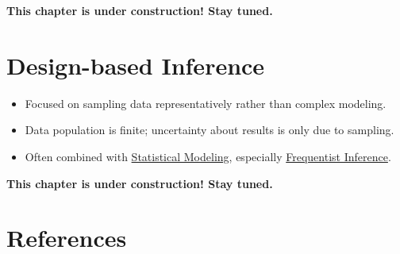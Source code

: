 \documentclass[
  10pt,
]{scrbook}
\providecommand{\tightlist}{%
  \setlength{\itemsep}{0pt}\setlength{\parskip}{0pt}}
\begin{document}
\textbf{This chapter is under construction! Stay tuned.}

\hypertarget{design-based-inference}{%
\chapter{Design-based Inference}\label{design-based-inference}}

\begin{itemize}
\tightlist
\item
  Focused on sampling data representatively rather than complex modeling.
\item
  Data population is finite; uncertainty about results is only due to sampling.
\item
  Often combined with \protect\hyperlink{statistical-modeling}{Statistical Modeling}, especially \protect\hyperlink{frequentist-inference}{Frequentist Inference}.
\end{itemize}

\textbf{This chapter is under construction! Stay tuned.}

\hypertarget{references-2}{%
\chapter*{References}\label{references-2}}
\end{document}
